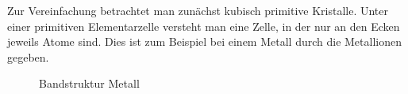 Zur Vereinfachung betrachtet man zunächst kubisch primitive Kristalle. Unter einer primitiven Elementarzelle versteht man eine Zelle, in der nur an den Ecken jeweils Atome sind. Dies ist zum Beispiel bei einem Metall durch die Metallionen gegeben.

\begin{figure}[H]
	\begin{minipage}{.5\linewidth}
		\centering
	\end{minipage}%
	\begin{minipage}{.5\linewidth}
		\centering
	\end{minipage}\par\medskip
	\caption{Bandstruktur Metall \protect\cite{HL1}}
\label{fig:bandstr_kubPrim_a}
\end{figure}

